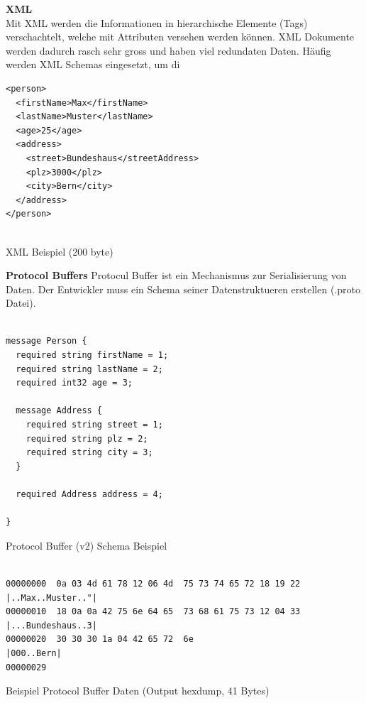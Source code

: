 \textbf{XML} \\
Mit XML werden die Informationen in hierarchische Elemente (Tags) verschachtelt, welche mit Attributen versehen werden können. XML Dokumente werden dadurch rasch sehr gross und haben viel redundaten Daten. Häufig werden XML Schemas eingesetzt, um di

\begin{listing}[H]
\begin{verbatim}
<person>
  <firstName>Max</firstName>
  <lastName>Muster</lastName>
  <age>25</age>
  <address>
    <street>Bundeshaus</streetAddress>
    <plz>3000</plz>
    <city>Bern</city>
  </address>
</person>


\end{verbatim}
\caption{XML Beispiel (200 byte)}
\end{listing}



\textbf{Protocol Buffers}
Protocul Buffer ist ein Mechanismus zur Serialisierung von Daten. Der Entwickler muss ein Schema seiner Datenstruktueren erstellen (.proto Datei).

\begin{listing}[H]
\begin{verbatim}

message Person {
  required string firstName = 1;
  required string lastName = 2;
  required int32 age = 3;

  message Address {
    required string street = 1;
    required string plz = 2;
    required string city = 3;
  }
  
  required Address address = 4;

}

\end{verbatim}
\caption{Protocol Buffer (v2) Schema Beispiel}
\end{listing}


\begin{listing}[H]
\begin{verbatim}
               
00000000  0a 03 4d 61 78 12 06 4d  75 73 74 65 72 18 19 22  |..Max..Muster.."|
00000010  18 0a 0a 42 75 6e 64 65  73 68 61 75 73 12 04 33  |...Bundeshaus..3|
00000020  30 30 30 1a 04 42 65 72  6e                       |000..Bern|
00000029

\end{verbatim}
\caption{Beispiel Protocol Buffer Daten (Output hexdump, 41 Bytes)}
\end{listing}


